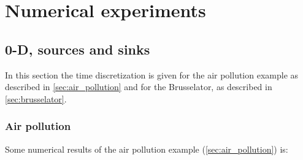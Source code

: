 \chapter{Numerical experiments}\label{sec:numerical_experiments}
\section{0-D, sources and sinks}\label{sec:0d_numerical_experiments}
In this section the time discretization is given for
the air pollution example as described in \autoref{sec:air_pollution}
and for
the Brusselator, as described in \autoref{sec:brusselator}.
\subsection{Air pollution}
Some numerical results of the air pollution example (\autoref{sec:air_pollution}) is:
